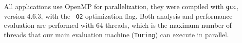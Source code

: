 %

%





All applications use OpenMP for parallelization, they were compiled with
\texttt{gcc}, version 4.6.3, with the \texttt{-O2} optimization flag.  Both
analysis and performance evaluation are performed with $64$ threads,
which is the maximum number of threads that our main evaluation machine
(\texttt{Turing}) can execute in parallel.


